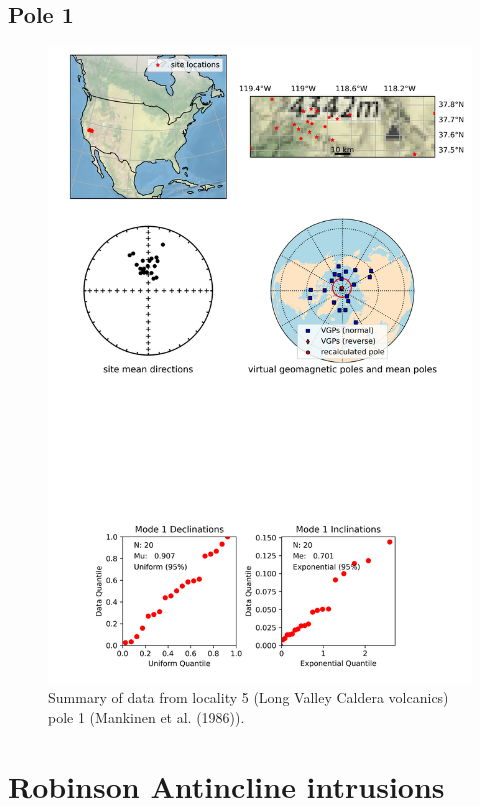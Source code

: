 \subsection{Pole 1}


\begin{figure}[H]
\centering
\includegraphics[width=5 in]{./5/1/pole_summary.png}
\caption{Summary of data from locality 5 (Long Valley Caldera volcanics) pole 1 (Mankinen et al. (1986)).}
\end{figure}

\section{Robinson Antincline intrusions}

